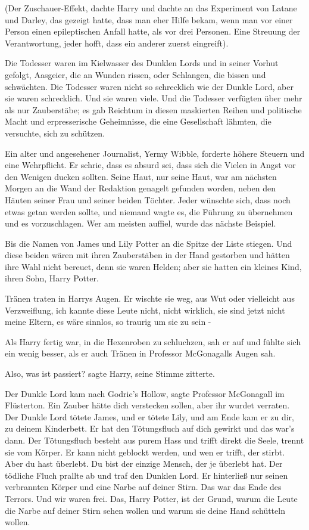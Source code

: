 (Der Zuschauer-Effekt, dachte Harry und dachte an das Experiment von Latane und
Darley, das gezeigt hatte, dass man eher Hilfe bekam, wenn man vor einer Person
einen epileptischen Anfall hatte, als vor drei Personen. Eine Streuung der
Verantwortung, jeder hofft, dass ein anderer zuerst eingreift).

Die Todesser waren im Kielwasser des Dunklen Lords und in seiner Vorhut gefolgt,
Aasgeier, die an Wunden rissen, oder Schlangen, die bissen und schwächten. Die
Todesser waren nicht so schrecklich wie der Dunkle Lord, aber sie waren
schrecklich. Und sie waren viele. Und die Todesser verfügten über mehr als nur
Zauberstäbe; es gab Reichtum in diesen maskierten Reihen und politische Macht
und erpresserische Geheimnisse, die eine Gesellschaft lähmten, die versuchte,
sich zu schützen.

Ein alter und angesehener Journalist, Yermy Wibble, forderte höhere Steuern und
eine Wehrpflicht. Er schrie, dass es absurd sei, dass sich die Vielen in Angst
vor den Wenigen ducken sollten. Seine Haut, nur seine Haut, war am nächsten
Morgen an die Wand der Redaktion genagelt gefunden worden, neben den Häuten
seiner Frau und seiner beiden Töchter. Jeder wünschte sich, dass noch etwas
getan werden sollte, und niemand wagte es, die Führung zu übernehmen und es
vorzuschlagen. Wer am meisten auffiel, wurde das nächste Beispiel.

Bis die Namen von James und Lily Potter an die Spitze der Liste stiegen. Und
diese beiden wären mit ihren Zauberstäben in der Hand gestorben und hätten ihre
Wahl nicht bereuet, denn sie waren Helden; aber sie hatten ein kleines Kind,
ihren Sohn, Harry Potter.

Tränen traten in Harrys Augen. Er wischte sie weg, aus Wut oder vielleicht aus
Verzweiflung, ich kannte diese Leute nicht, nicht wirklich, sie sind jetzt nicht
meine Eltern, es wäre sinnlos, so traurig um sie zu sein -

Als Harry fertig war, in die Hexenroben zu schluchzen, sah er auf und fühlte
sich ein wenig besser, als er auch Tränen in Professor McGonagalls Augen sah.

\glqq{}Also, was ist passiert?\grqq{} sagte Harry, seine Stimme zitterte.

\glqq{}Der Dunkle Lord kam nach Godric's Hollow\grqq{}, sagte Professor
McGonagall im Flüsterton. \glqq{}Ein Zauber hätte dich verstecken sollen, aber
ihr wurdet verraten. Der Dunkle Lord tötete James, und er tötete Lily, und am
Ende kam er zu dir, zu deinem Kinderbett. Er hat den Tötungsfluch auf dich
gewirkt und das war's dann. Der Tötungsfluch besteht aus purem Hass und trifft
direkt die Seele, trennt sie vom Körper. Er kann nicht geblockt werden, und wen
er trifft, der stirbt. Aber du hast überlebt. Du bist der einzige Mensch, der je
überlebt hat. Der tödliche Fluch prallte ab und traf den Dunklen Lord. Er
hinterließ nur seinen verbrannten Körper und eine Narbe auf deiner Stirn. Das
war das Ende des Terrors. Und wir waren frei. Das, Harry Potter, ist der Grund,
warum die Leute die Narbe auf deiner Stirn sehen wollen und warum sie deine Hand
schütteln wollen.\grqq{}

